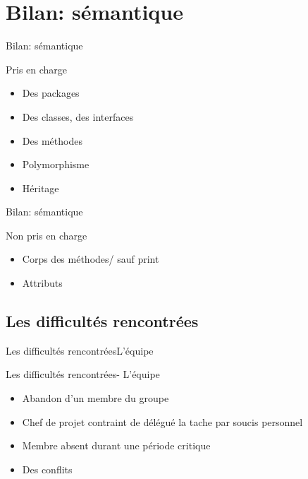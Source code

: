 \section{Bilan: sémantique}
    \begin{frame}{Bilan: sémantique}
    	\begin{block}{Pris en charge}
    		\begin{itemize}
				\item<1-> Des packages
				\item<2-> Des classes, des interfaces
				\item<3-> Des méthodes 
				\item<4-> Polymorphisme
				\item<5-> Héritage
    		\end{itemize}
    	\end{block}
    \end{frame}

    \begin{frame}{Bilan: sémantique}
    	\begin{block}{Non pris en charge}
    		\begin{itemize}
				\item<1-> Corps des méthodes/ sauf print
				\item<2-> Attributs
    		\end{itemize}
    	\end{block}

    \end{frame}
    \subsection{Les difficultés rencontrées}
	    \begin{frame}{Les difficultés rencontrées}{L'équipe}
	    	\begin{block}{Les difficultés rencontrées- L'équipe}
	    		\begin{itemize}
					\item<1-> Abandon d’un membre du groupe 
					\item<2-> Chef de projet contraint de délégué la tache par soucis personnel
					\item<3-> Membre absent durant une période critique
					\item<4-> Des conflits
	    		\end{itemize}
	    	\end{block}
	    \end{frame}

